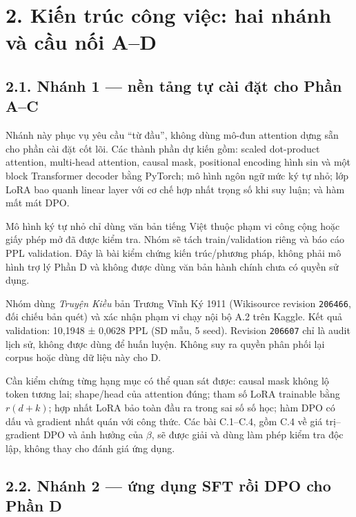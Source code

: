 \documentclass[11pt,a4paper]{article}
\begin{document}
\section{2. Kiến trúc công việc: hai nhánh và cầu nối
A--D}\label{kiux1ebfn-truxfac-cuxf4ng-viux1ec7c-hai-nhuxe1nh-vuxe0-cux1ea7u-nux1ed1i-ad}

\subsection{2.1. Nhánh 1 --- nền tảng tự cài đặt cho Phần
A--C}\label{nhuxe1nh-1-nux1ec1n-tux1ea3ng-tux1ef1-cuxe0i-ux111ux1eb7t-cho-phux1ea7n-ac}

Nhánh này phục vụ yêu cầu ``từ đầu'', không dùng mô-đun attention dựng
sẵn cho phần cài đặt cốt lõi. Các thành phần dự kiến gồm: scaled
dot-product attention, multi-head attention, causal mask, positional
encoding hình sin và một block Transformer decoder bằng PyTorch; mô hình
ngôn ngữ mức ký tự nhỏ; lớp LoRA bao quanh linear layer với cơ chế hợp
nhất trọng số khi suy luận; và hàm mất mát DPO.

Mô hình ký tự nhỏ chỉ dùng văn bản tiếng Việt thuộc phạm vi công cộng
hoặc giấy phép mở đã được kiểm tra. Nhóm sẽ tách train/validation riêng
và báo cáo PPL validation. Đây là bài kiểm chứng kiến trúc/phương pháp,
không phải mô hình trợ lý Phần D và không được dùng văn bản hành chính
chưa có quyền sử dụng.

Nhóm dùng \emph{Truyện Kiều} bản Trương Vĩnh Ký 1911 (Wikisource
revision \nolinkurl{206466}, đối chiếu bản quét) và xác nhận phạm vi
chạy nội bộ A.2 trên Kaggle. Kết quả validation: 10,1948 ± 0,0628 PPL
(SD mẫu, 5 seed). Revision \nolinkurl{206607} chỉ là audit lịch sử,
không được dùng để huấn luyện. Không suy ra quyền phân phối lại corpus
hoặc dùng dữ liệu này cho D.

Cần kiểm chứng từng hạng mục có thể quan sát được: causal mask không lộ
token tương lai; shape/head của attention đúng; tham số LoRA trainable
bằng \(r(d+k)\); hợp nhất LoRA bảo toàn đầu ra trong sai số số học; hàm
DPO có dấu và gradient nhất quán với công thức. Các bài C.1--C.4, gồm
C.4 về giá trị--gradient DPO và ảnh hưởng của \(\beta\), sẽ được giải và
dùng làm phép kiểm tra độc lập, không thay cho đánh giá ứng dụng.

\subsection{2.2. Nhánh 2 --- ứng dụng SFT rồi DPO cho Phần
D}\label{nhuxe1nh-2-ux1ee9ng-dux1ee5ng-sft-rux1ed3i-dpo-cho-phux1ea7n-d}
\end{document}
